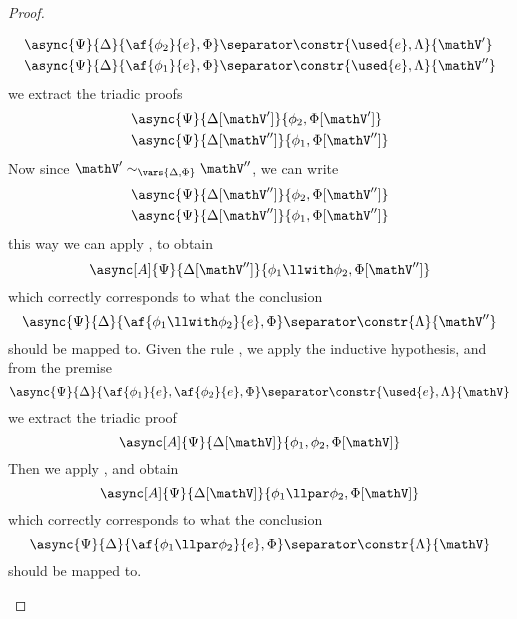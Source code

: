\begin{proof}
\begin{itemize}
			\begin{align*}
				&\async{\Psi}{\Delta}{\af{\phi_2}{e}, \Phi} \separator \constr{\used{e}, \Lambda}{\mathV'} \\
				&\async{\Psi}{\Delta}{\af{\phi_1}{e}, \Phi} \separator \constr{\used{e}, \Lambda}{\mathV''} 
			\end{align*}
			we extract the triadic proofs
			\begin{align*}
			 	&\async{\Psi}{\Delta[\mathV']}{\phi_2, \Phi[\mathV']} \\
			 	&\async{\Psi}{\Delta[\mathV'']}{\phi_1, \Phi[\mathV'']}
			\end{align*}
			Now since $\mathV' \sim_{\vars{\Delta, \Phi}} \mathV''$, we can write
			\begin{align*}
				&\async{\Psi}{\Delta[\mathV'']}{\phi_2, \Phi[\mathV'']} \\
				&\async{\Psi}{\Delta[\mathV'']}{\phi_1, \Phi[\mathV'']}
			\end{align*}
			this way we can apply \derRule[A]{\displaywith}, to obtain
			$$ \async[A]{\Psi}{\Delta[\mathV'']}{\phi_1 \llwith \phi_2, \Phi[\mathV'']} $$
			which correctly corresponds to what the conclusion
			$$ \async{\Psi}{\Delta}{\af{\phi_1 \llwith \phi_2}{e}, \Phi} \separator \constr{\Lambda}{\mathV''} $$
			should be mapped to.
		\indCase{\displaypar} Given the rule \derRule{\displaypar}, we apply the inductive hypothesis, and from the premise
			$$ \async{\Psi}{\Delta}{\af{\phi_1}{e}, \af{\phi_2}{e}, \Phi} \separator \constr{\used{e}, \Lambda}{\mathV}$$
			we extract the triadic proof 
			$$\async[A]{\Psi}{\Delta[\mathV]}{\phi_1, \phi_2, \Phi[\mathV]} $$
			Then we apply \derRule[A]{\displaypar}, and obtain
			$$\async[A]{\Psi}{\Delta[\mathV]}{\phi_1 \llpar \phi_2, \Phi[\mathV]} $$
			which correctly corresponds to what the conclusion
			$$ \async{\Psi}{\Delta}{\af{\phi_1 \llpar \phi_2}{e}, \Phi} \separator \constr{\Lambda}{\mathV} $$
			should be mapped to.

\end{itemize}
\end{proof}
